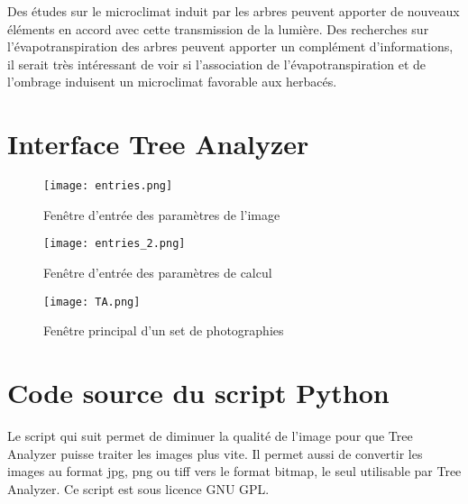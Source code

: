 ﻿\documentclass[12pt]{report}
\begin{document}
Des études sur le microclimat induit par les arbres peuvent apporter de nouveaux
éléments en accord avec cette transmission de la lumière. Des recherches sur
l'évapotranspiration des arbres peuvent apporter un complément d'informations,
il serait très intéressant de voir si l'association de l'évapotranspiration et
de l'ombrage induisent un microclimat favorable aux herbacés.





\appendix

\chapter{Interface Tree Analyzer}\label{App:appxA}

\begin{figure}
  \centering
  \texttt{[image: entries.png]}
  \caption{Fenêtre d'entrée des paramètres de l'image}
\end{figure}

\begin{figure}
  \centering
  \texttt{[image: entries\_2.png]}
  \caption{Fenêtre d'entrée des paramètres de calcul}
\end{figure}

\begin{figure}
  \centering
  \texttt{[image: TA.png]}
  \caption{Fenêtre principal d'un set de photographies}
\end{figure}


\chapter{Code source du script Python}\label{App:appxB}


Le script qui suit permet de diminuer la qualité de l'image pour que Tree Analyzer puisse
traiter les images plus vite. Il permet aussi de convertir les images au format
jpg, png ou tiff vers le format bitmap, le seul utilisable par Tree Analyzer. Ce
script est sous licence GNU GPL.
\end{document}
